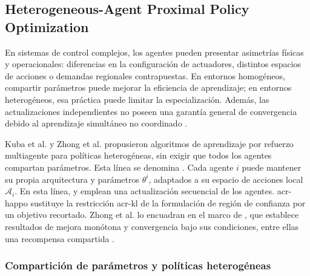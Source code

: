\subsection[HAPPO]{Heterogeneous-Agent Proximal Policy Optimization}\label{subsec:happo}

En sistemas de control complejos, los agentes pueden presentar asimetrías físicas y operacionales: diferencias en la configuración de actuadores, distintos espacios de acciones o demandas regionales contrapuestas. En entornos homogéneos, compartir parámetros puede mejorar la eficiencia de aprendizaje; en entornos heterogéneos, esa práctica puede limitar la especialización. Además, las actualizaciones independientes no poseen una garantía general de convergencia debido al aprendizaje simultáneo no coordinado \cite{kuba2021trust}.

Kuba et al. y Zhong et al. propusieron algoritmos de aprendizaje por refuerzo multiagente para políticas heterogéneas, sin exigir que todos los agentes compartan parámetros. Esta línea se denomina . Cada agente $i$ puede mantener su propia arquitectura y parámetros $\theta^i$, adaptados a su espacio de acciones local $\mathcal{A}_i$. En esta línea,  y  emplean una actualización secuencial de los agentes. \acrshort{acr-happo} sustituye la restricción \acrshort{acr-kl} de la formulación de región de confianza por un objetivo recortado. Zhong et al. lo encuadran en el marco de , que establece resultados de mejora monótona y convergencia bajo sus condiciones, entre ellas una recompensa compartida \cite{kuba2021trust,zhong2024heterogeneous}.

\subsubsection{Compartición de parámetros y políticas heterogéneas}

